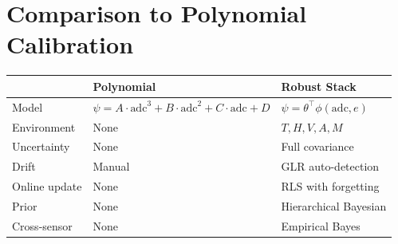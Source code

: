 \documentclass[11pt]{article}
\begin{document}
\section{Comparison to Polynomial Calibration}

\begin{center}
\begin{tabular}{|l|l|l|}
\hline
 & Polynomial & Robust Stack \\
\hline
Model & $\psi = A \cdot \text{adc}^3 + B \cdot \text{adc}^2 + C \cdot \text{adc} + D$ & $\psi = \theta^\top \phi(\text{adc}, e)$ \\
Environment & None & $T, H, V, A, M$ \\
Uncertainty & None & Full covariance \\
Drift & Manual & GLR auto-detection \\
Online update & None & RLS with forgetting \\
Prior & None & Hierarchical Bayesian \\
Cross-sensor & None & Empirical Bayes \\
\hline
\end{tabular}
\end{center}
\end{document}
